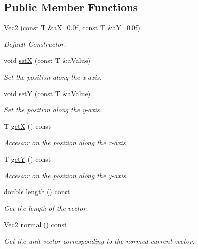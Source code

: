 \subsection*{Public Member Functions}
\begin{DoxyCompactItemize}
\item 
\hyperlink{class_math_1_1_vec2_a150f8a5f9a8159902f4ec1e699c7f0e8}{Vec2} (const T \&aX=0.0f, const T \&aY=0.0f)
\begin{DoxyCompactList}\small\item\em Default Constructor. \end{DoxyCompactList}\item 
void \hyperlink{class_math_1_1_vec2_ae394c7d2d2c1330cb5fa210ec5149d0d}{setX} (const T \&aValue)
\begin{DoxyCompactList}\small\item\em Set the position along the x-\/axis. \end{DoxyCompactList}\item 
void \hyperlink{class_math_1_1_vec2_a7748fb246d30fc62d4df66644a6de50b}{setY} (const T \&aValue)
\begin{DoxyCompactList}\small\item\em Set the position along the y-\/axis. \end{DoxyCompactList}\item 
T \hyperlink{class_math_1_1_vec2_a0a655d0d8cea609614afd3915b06c48a}{getX} () const 
\begin{DoxyCompactList}\small\item\em Accessor on the position along the x-\/axis. \end{DoxyCompactList}\item 
T \hyperlink{class_math_1_1_vec2_a270be9de3e990f63e60ce5c77dfb9ce5}{getY} () const 
\begin{DoxyCompactList}\small\item\em Accessor on the position along the y-\/axis. \end{DoxyCompactList}\item 
double \hyperlink{class_math_1_1_vec2_a24a9732993bdeb320dafea6ba8acb7cb}{length} () const 
\begin{DoxyCompactList}\small\item\em Get the length of the vector. \end{DoxyCompactList}\item 
\hyperlink{class_math_1_1_vec2}{Vec2} \hyperlink{class_math_1_1_vec2_a8fc99f9aba2e1509fc87859d9ec91b5c}{normal} () const 
\begin{DoxyCompactList}\small\item\em Get the unit vector corresponding to the normed current vector. \end{DoxyCompactList}\item 

\end{DoxyCompactItemize}
